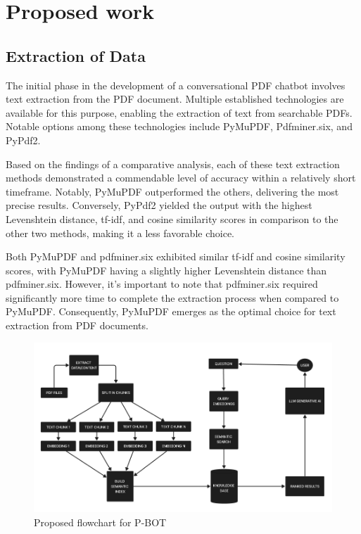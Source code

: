 \documentclass[fleqn,10pt]{thescipub} %
\begin{document}
\baselineskip

\clearpage  %

\section{Proposed work}
\subsection{Extraction of Data}
The initial phase in the development of a conversational PDF chatbot involves text extraction from the PDF document. Multiple established technologies are available for this purpose, enabling the extraction of text from searchable PDFs. Notable options among these technologies include PyMuPDF, Pdfminer.six, and PyPdf2.

Based on the findings of a comparative analysis, each of these text extraction methods demonstrated a commendable level of accuracy within a relatively short timeframe. Notably, PyMuPDF outperformed the others, delivering the most precise results. Conversely, PyPdf2 yielded the output with the highest Levenshtein distance, tf-idf, and cosine similarity scores in comparison to the other two methods, making it a less favorable choice.

Both PyMuPDF and pdfminer.six exhibited similar tf-idf and cosine similarity scores, with PyMuPDF having a slightly higher Levenshtein distance than pdfminer.six. However, it's important to note that pdfminer.six required significantly more time to complete the extraction process when compared to PyMuPDF. Consequently, PyMuPDF emerges as the optimal choice for text extraction from PDF documents.

\begin{figure}
    \centering
    \includegraphics[width=\textwidth]{FLOWC}
    \caption{Proposed flowchart for P-BOT}
    \label{fig:your_image_label}
\end{figure}
\end{document}
